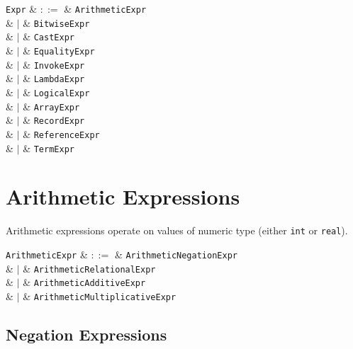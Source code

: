 \begin{syntax}
  \verb+Expr+ & $::=$ & \verb+ArithmeticExpr+\\
                  &  $|$  & \verb+BitwiseExpr+\\
                  &  $|$  & \verb+CastExpr+\\
                  &  $|$  & \verb+EqualityExpr+\\
                  &  $|$  & \verb+InvokeExpr+\\
                  &  $|$  & \verb+LambdaExpr+\\
                  &  $|$  & \verb+LogicalExpr+\\
                  &  $|$  & \verb+ArrayExpr+\\
                  &  $|$  & \verb+RecordExpr+\\
                  &  $|$  & \verb+ReferenceExpr+\\
                  &  $|$  & \verb+TermExpr+\\
                
\end{syntax}


\section{Arithmetic Expressions}
\label{c_expr_arithmetic}

Arithmetic expressions operate on values of numeric type (either \lstinline{int} or \lstinline{real}).

\begin{syntax}
  \verb+ArithmeticExpr+ & $::=$ & \verb+ArithmeticNegationExpr+\\
                  &  $|$  & \verb+ArithmeticRelationalExpr+\\
                  &  $|$  & \verb+ArithmeticAdditiveExpr+\\
                  &  $|$  & \verb+ArithmeticMultiplicativeExpr+\\
\end{syntax}


\subsection{Negation Expressions}
\label{c_expr_negation}

